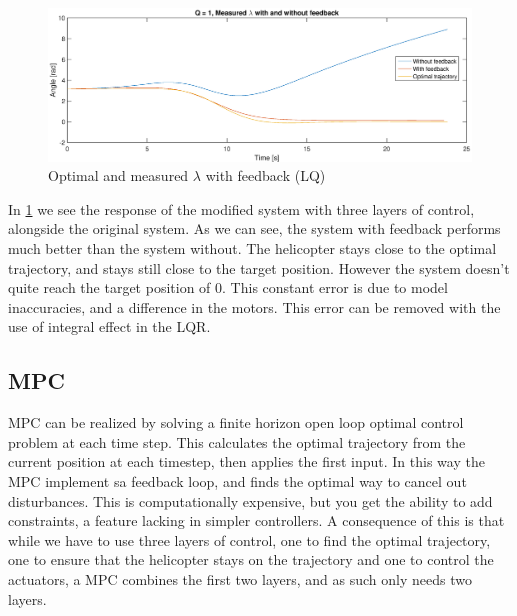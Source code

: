 \begin{figure}[h]
    \includegraphics[width=\textwidth]{ex3_with_vs_without_feedback.eps}
    \caption{Optimal and measured $\lambda$ with feedback (LQ)}
    \label{fig:opt_meas_lambda_ex3}
\end{figure}

In \cref{fig:opt_meas_lambda_ex3} we see the response of the modified system with three layers of control, alongside the original system. As we can see, the system with feedback performs much better than the system without. The helicopter stays close to the optimal trajectory, and stays still close to the target position. However the system doesn't quite reach the target position of 0. This constant error is due to model inaccuracies, and a difference in the motors. This error can be removed with the use of integral effect in the LQR.


\subsection{MPC}
MPC can be realized by solving a finite horizon open loop optimal control problem at each time step. This calculates the optimal trajectory from the current position at each timestep, then applies the first input. In this way the MPC implement sa feedback loop, and finds the optimal way to cancel out disturbances. This is computationally expensive, but you get the ability to add constraints, a feature lacking in simpler controllers. A consequence of this is that while we have to use three layers of control, one to find the optimal trajectory, one to ensure that the helicopter stays on the trajectory and one to control the actuators, a MPC combines the first two layers, and as such only needs two layers.

%
%
